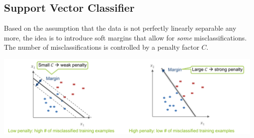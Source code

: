 \documentclass[11pt]{article}
\theoremstyle{definition}
\begin{document}
\subsection{Support Vector Classifier}
Based on the assumption that the data is not perfectly linearly separable any more, the idea is to introduce soft margins that allow for \emph{some} misclassifications. The number of misclassifications is controlled by a {\color{DodgerBlue2} penalty factor} $C$.

\begin{center}
	\includegraphics[width=0.7\linewidth]{img/support_vector_classifier}
\end{center}
\end{document}
